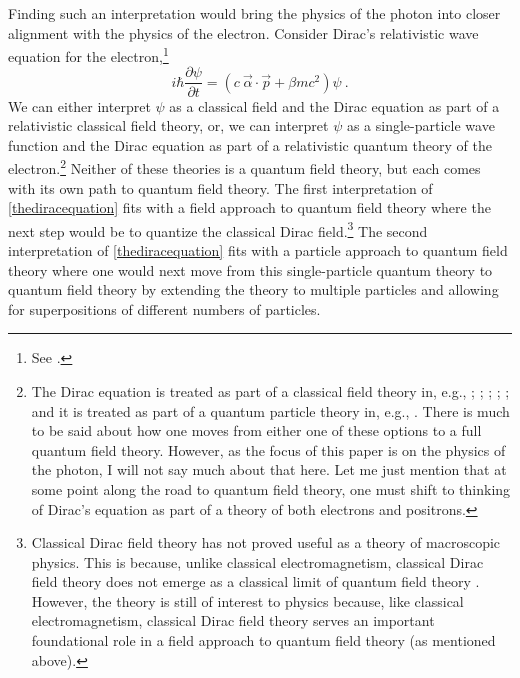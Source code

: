 \documentclass[12pt,secnumarabic,amsmath,amssymb,balancelastpage,nofootinbib]{article}
\begin{document}
Finding such an interpretation would bring the physics of the photon into closer alignment with the physics of the electron.  Consider Dirac's relativistic wave equation for the electron,\footnote{See \citet[sec.\ 1.3]{bjorkendrell}.}
\begin{equation}
i\hbar \frac{\partial \psi}{\partial t}=\left(c\:\vec{\alpha}\cdot\vec{p}+\beta m c^2 \right)\psi
\ .
\label{thediracequation}
\end{equation}
We can either interpret $\psi$ as a classical field and the Dirac equation as part of a relativistic classical field theory, or, we can interpret $\psi$ as a single-particle wave function and the Dirac equation as part of a relativistic quantum theory of the electron.\footnote{The Dirac equation is treated as part of a classical field theory in, e.g., \citet{hatfield}; \citet[ch.\ 4]{valentini1992}; \citet{peskinschroeder}; \citet[sec.\ 4.3]{ryder1996}; \citet[ch.\ 5]{greiner1996}; \citet{howelectronsspin} and it is treated as part of a quantum particle theory in, e.g., \citet{frenkel, dirac, schweberQFT, bjorkendrell, thaller1992}.  There is much to be said about how one moves from either one of these options to a full quantum field theory.  However, as the focus of this paper is on the physics of the photon, I will not say much about that here.  Let me just mention that at some point along the road to quantum field theory, one must shift to thinking of Dirac's equation as part of a theory of both electrons and positrons.}  Neither of these theories is a quantum field theory, but each comes with its own path to quantum field theory.  The first interpretation of \eqref{thediracequation} fits with a field approach to quantum field theory where the next step would be to quantize the classical Dirac field.\footnote{Classical Dirac field theory has not proved useful as a theory of macroscopic physics.  This is because, unlike classical electromagnetism, classical Dirac field theory does not emerge as a classical limit of quantum field theory \citep[pg.\ 221]{duncan}.  However, the theory is still of interest to physics because, like classical electromagnetism, classical Dirac field theory serves an important foundational role in a field approach to quantum field theory (as mentioned above).}  The second interpretation of \eqref{thediracequation} fits with a particle approach to quantum field theory where one would next move from this single-particle quantum theory to quantum field theory by extending the theory to multiple particles and allowing for superpositions of different numbers of particles.
\end{document}
